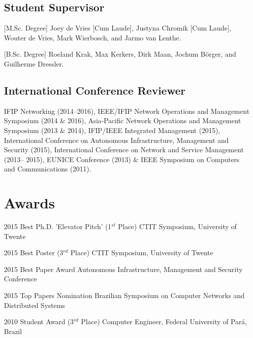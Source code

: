 \documentclass[print]{friggeri-cv} %
\begin{document}
\subsection{Student Supervisor}

\begin{entrylist}
\vspace{-0.3cm}
\entry
{[M.Sc. Degree]}
{Joey de Vries [Cum Laude], Justyna Chromik [Cum Laude], Wouter de Vries, Mark Wierbosch, and Jarmo van Lenthe.}
{}

\vspace{-0.3cm}
\entry
{[B.Sc. Degree]}
{Roeland Krak, Max Kerkers, Dirk Maan, Jochum Börger, and Guilherme Dressler.}
{}

\end{entrylist}

\subsection{International Conference Reviewer}
IFIP Networking (2014--2016), IEEE/IFIP Network Operations and Management Symposium (2014 \& 2016), Asia-Pacific Network Operations and Management Symposium (2013 \& 2014), IFIP/IEEE Integrated Management (2015), International Conference on Autonomous Infrastructure, Management and Security (2015), International Conference on Network and Service Management (2013-- 2015), EUNICE Conference (2013) \& IEEE Symposium on Computers and Communications (2011).\\


\section{Awards}

\begin{entrylist}
\vspace{-0.3cm}
\entry
{2015}
{Best Ph.D. 'Elevator Pitch' (1$^{st}$ Place)}
{CTIT Symposium, University of Twente}

\vspace{-0.3cm}
\entry
{2015}
{Best Poster (3$^{rd}$ Place)}
{CTIT Symposium, University of Twente}

\vspace{-0.3cm}
\entry
{2015}
{Best Paper Award}
{Autonomous Infrastructure, Management and Security Conference}

\vspace{-0.3cm}
\entry
{2015}
{Top Papers Nomination}
{Brazilian Symposium on Computer Networks and Distributed Systems}

\vspace{-0.3cm}
\entry
{2010}
{Student Award (3$^{rd}$ Place)}
{Computer Engineer, Federal University of Pará, Brazil}

\end{entrylist}
\end{document}
